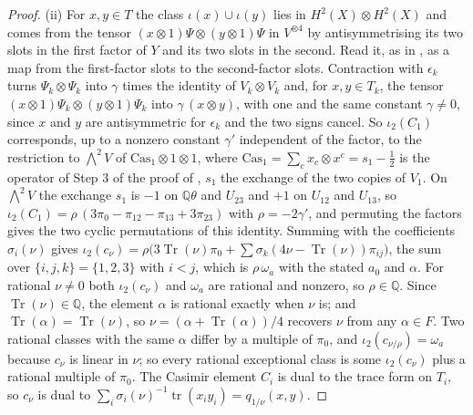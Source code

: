 \documentclass[11pt,reqno]{amsart}
\theoremstyle{plain}
\theoremstyle{definition}
\theoremstyle{remark}
\newcommand{\QQ}{\mathbb{Q}}
\DeclareMathOperator{\Tr}{Tr}
\begin{document}
\begin{proof}
(ii) For $x,y\in T$ the class $\iota(x)\cup\iota(y)$ lies in
$H^{2}(X)\otimes H^{2}(X)$ and comes from the tensor
$(x\otimes1)\Psi\otimes(y\otimes1)\Psi$ in $V^{\otimes4}$ by antisymmetrising
its two slots in the first factor of $Y$ and its two slots in the second.
Read it, as in , as a map from the first-factor slots to
the second-factor slots. Contraction with $\epsilon_{k}$ turns
$\Psi_{k}\otimes\Psi_{k}$ into $\gamma$ times the identity of
$V_{k}\otimes V_{k}$ and, for $x,y\in T_{k}$, the tensor
$(x\otimes1)\Psi_{k}\otimes(y\otimes1)\Psi_{k}$ into $\gamma\,(x\otimes y)$,
with one and the same constant $\gamma\ne0$, since $x$ and $y$ are
antisymmetric for $\epsilon_{k}$ and the two signs cancel. So $\iota_{2}(C_{1})$
corresponds, up to a nonzero constant $\gamma'$ independent of the factor, to
the restriction to $\bigwedge^{2}V$ of $\mathrm{Cas}_{1}\otimes1\otimes1$,
where $\mathrm{Cas}_{1}=\sum_{c}x_{c}\otimes x^{c}=s_{1}-\frac12$ is the
operator of Step 3 of the proof of , $s_{1}$ the
exchange of the two copies of $V_{1}$. On $\bigwedge^{2}V$ the exchange
$s_{1}$ is $-1$ on $\QQ\theta$ and $U_{23}$ and $+1$ on $U_{12}$ and $U_{13}$,
so $\iota_{2}(C_{1})=\rho\,(3\pi_{0}-\pi_{12}-\pi_{13}+3\pi_{23})$ with
$\rho=-2\gamma'$, and permuting the factors gives the two cyclic permutations
of this identity. Summing with the coefficients $\sigma_{i}(\nu)$ gives
$\iota_{2}(c_{\nu})=\rho\bigl(3\Tr(\nu)\pi_{0}+\sum\sigma_{k}(4\nu-\Tr(\nu))
\pi_{ij}\bigr)$, the sum over $\{i,j,k\}=\{1,2,3\}$ with $i<j$, which is
$\rho\,\omega_{a}$ with the stated $a_{0}$ and $\alpha$. For rational $\nu\ne0$
both $\iota_{2}(c_{\nu})$ and $\omega_{a}$ are rational and nonzero, so
$\rho\in\QQ$. Since
$\Tr(\nu)\in\QQ$, the element $\alpha$ is rational exactly when $\nu$ is; and
$\Tr(\alpha)=\Tr(\nu)$, so $\nu=(\alpha+\Tr(\alpha))/4$ recovers $\nu$ from
any $\alpha\in F$. Two rational classes with the same $\alpha$ differ by a
multiple of $\pi_{0}$, and $\iota_{2}(c_{\nu/\rho})=\omega_{a}$ because
$c_{\nu}$ is linear in $\nu$; so every rational exceptional class is some
$\iota_{2}(c_{\nu})$ plus a rational multiple of $\pi_{0}$. The Casimir element $C_{i}$ is dual to the trace form
on $T_{i}$, so $c_{\nu}$ is dual to $\sum_{i}\sigma_{i}(\nu)^{-1}
\operatorname{tr}(x_{i}y_{i})=q_{1/\nu}(x,y)$.


\end{proof}
\end{document}
